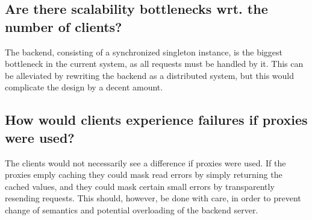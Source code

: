 \documentclass[11pt,a4paper]{article}
\begin{document}
\subsection{Are there scalability bottlenecks wrt. the number of clients?}
The backend, consisting of a synchronized singleton instance, is the biggest
bottleneck in the current system, as all requests must be handled by it. This
can be alleviated by rewriting the backend as a distributed system, but this
would complicate the design by a decent amount.

\subsection{How would clients experience failures if proxies were used?}
The clients would not necessarily see a difference if proxies were used. If
the proxies emply caching they could mask read errors by simply returning
the cached values, and they could mask certain small errors by transparently
resending requests. This should, however, be done with care, in order to
prevent change of semantics and potential overloading of the backend server.
\end{document}
